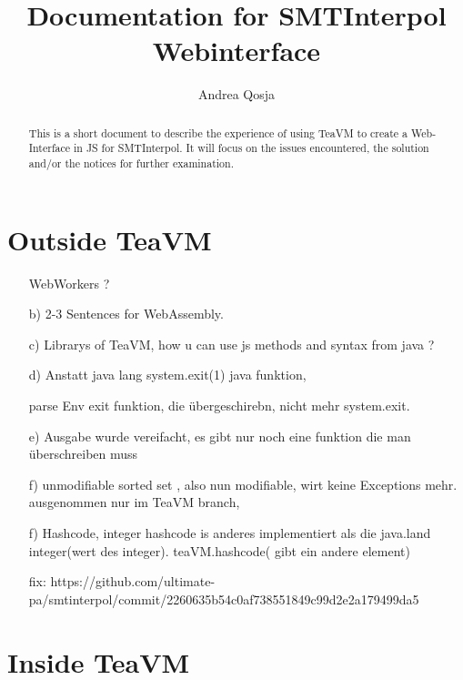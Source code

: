 \documentclass[]{article}
\title{Documentation for SMTInterpol Webinterface}
\author{Andrea Qosja}
\begin{document}
\maketitle

\begin{abstract}
This is a short document to describe the experience of using TeaVM to create a Web-Interface in JS for SMTInterpol. It will focus on the issues encountered, the solution and/or the notices for further examination.
\end{abstract}

\section{Outside TeaVM}

\begin{itemize}

\item[]  WebWorkers ?

\item[b)]  2-3 Sentences for WebAssembly.

\item[c)]  Librarys of TeaVM, how u can use js methods and syntax from java ?

\item[d)] Anstatt java lang system.exit(1) java funktion,

parse Env exit funktion, die übergeschirebn, nicht mehr system.exit.

\item[e)] Ausgabe wurde vereifacht, es gibt nur noch eine funktion die man überschreiben muss

\item[f)] unmodifiable sorted set , also nun modifiable, wirt keine Exceptions mehr. ausgenommen nur im TeaVM branch, 

\item[f)] Hashcode, integer hashcode is anderes implementiert als die java.land integer(wert des integer). teaVM.hashcode( gibt ein andere element)

fix: https://github.com/ultimate-pa/smtinterpol/commit/2260635b54c0af738551849c99d2e2a179499da5


\end{itemize}


\section{Inside TeaVM}
\end{document}
